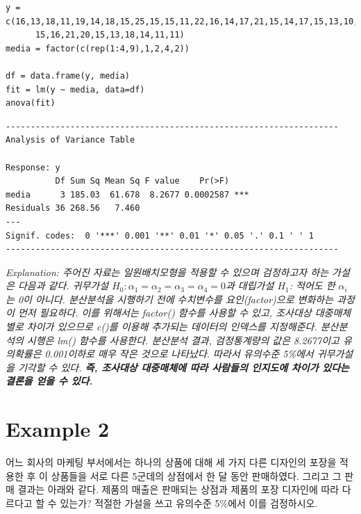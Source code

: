 \documentclass{article}
\begin{document}
\begin{lstlisting}[style={r-style}]
y = c(16,13,18,11,19,14,18,15,25,15,15,11,22,16,14,17,21,15,14,17,15,13,10,13,16,19,18,14,22,16,
      15,16,21,20,15,13,18,14,11,11)
media = factor(c(rep(1:4,9),1,2,4,2))

df = data.frame(y, media)
fit = lm(y ~ media, data=df)
anova(fit)
\end{lstlisting}
\begin{lstlisting}[style={out-style}]
-------------------------------------------------------------------
Analysis of Variance Table

Response: y
          Df Sum Sq Mean Sq F value    Pr(>F)    
media      3 185.03  61.678  8.2677 0.0002587 ***
Residuals 36 268.56   7.460                      
---
Signif. codes:  0 '***' 0.001 '**' 0.01 '*' 0.05 '.' 0.1 ' ' 1
-------------------------------------------------------------------
\end{lstlisting}
\emph{Explanation: 주어진 자료는 일원배치모형을 적용할 수 있으며 검정하고자 하는 가설은 다음과 같다. 귀무가설 $H_0: \alpha_1=\alpha_2=\alpha_3=\alpha_4=0$과 대립가설 $H_1$: 적어도 한 $\alpha_i$는 0이 아니다. 분산분석을 시행하기 전에 수치변수를 요인(factor)으로 변화하는 과정이 먼저 필요하다. 이를 위해서는 factor() 함수를 사용할 수 있고, 조사대상 대중매체 별로 차이가 있으므로 c()를 이용해 추가되는 데이터의 인덱스를 지정해준다. 분산분석의 시행은 lm() 함수를 사용한다. 분산분석 결과, 검정통계량의 값은 8.2677이고 유의확률은 0.001이하로 매우 작은 것으로 나타났다. 따라서 유의수준 5\%에서 귀무가설을 기각할 수 있다. \textbf{즉, 조사대상 대중매체에 따라 사람들의 인지도에 차이가 있다는 결론을 얻을 수 있다.}} \\

\section*{Example 2}
어느 회사의 마케팅 부서에서는 하나의 상품에 대해 세 가지 다른 디자인의 포장을
적용한 후 이 상품들을 서로 다른 5군데의 상점에서 한 달 동안 판매하였다. 그리고 그 판매
결과는 아래와 같다. 제품의 매출은 판매되는 상점과 제품의 포장 디자인에 따라 다르다고 할
수 있는가? 적절한 가설을 쓰고 유의수준 5\%에서 이를 검정하시오. 
\end{document}
